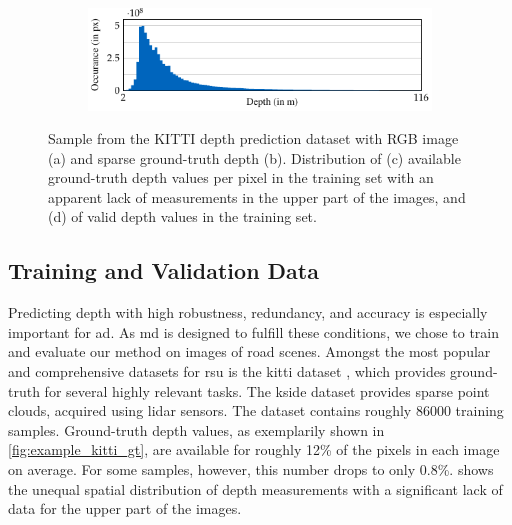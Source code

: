 \documentclass[lang=english]{tumarxivarticle}
\newcommand{\citep}{\parencite}
\begin{document}
\begin{figure}
  \vspace{2mm} %

  \begin{subfigure}{\linewidth}
    \includegraphics{tikz/multidepth_arxiv-figure1}
    \vspace{-0.2cm} %
    \caption{}
    \label{subfig:depth_distribution_kitti_depth}
  \end{subfigure}

  \caption{Sample from the KITTI depth prediction dataset \citep{Uhrig17, Geiger13} with RGB image (a) and sparse ground-truth depth (b).
  Distribution of (c) available ground-truth depth values per pixel in the training set with an apparent lack of measurements in the upper part of the images, and (d) of valid depth values in the training set.}
  \vspace{-0.5cm}
\end{figure}


\subsection{Training and Validation Data}
\label{subsec:data}

Predicting depth with high robustness, redundancy, and accuracy is especially important for \gls{ad}.
As \gls{md} is designed to fulfill these conditions, we chose to train and evaluate our method on images of road scenes.
Amongst the most popular and comprehensive datasets for \gls{rsu} is the \gls{kitti} dataset \citep{Geiger13}, which provides ground-truth for several highly relevant tasks.
The \gls{kside} dataset \citep{Uhrig17, Geiger13} provides sparse point clouds, acquired using \gls{lidar} sensors.
The dataset contains roughly \num{86000} training samples.
Ground-truth depth values, as exemplarily shown in \cref{fig:example_kitti_gt}, are available for roughly 12\% of the pixels in each image on average.
For some samples, however, this number drops to only 0.8\%.
 shows the unequal spatial distribution of depth measurements with a significant lack of data for the upper part of the images.
\end{document}
